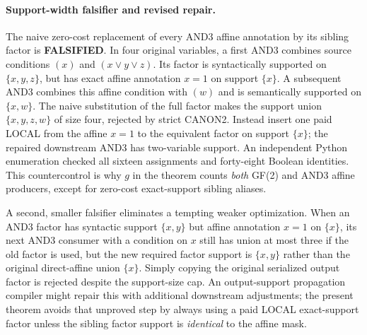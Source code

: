\documentclass[11pt]{article}
\begin{document}
\paragraph{Support-width falsifier and revised repair.}
The naive zero-cost replacement of every AND3 affine annotation by its sibling factor is \textbf{FALSIFIED}. In four original variables, a first AND3 combines source conditions $(x)$ and $(x\lor y\lor z)$. Its factor is syntactically supported on $\{x,y,z\}$, but has exact affine annotation $x=1$ on support $\{x\}$. A subsequent AND3 combines this affine condition with $(w)$ and is semantically supported on $\{x,w\}$. The naive substitution of the full factor makes the support union $\{x,y,z,w\}$ of size four, rejected by strict CANON2. Instead insert one paid LOCAL from the affine $x=1$ to the equivalent factor on support $\{x\}$; the repaired downstream AND3 has two-variable support. An independent Python enumeration checked all sixteen assignments and forty-eight Boolean identities. This countercontrol is why $g$ in the theorem counts \emph{both} GF(2) and AND3 affine producers, except for zero-cost exact-support sibling aliases.


A second, smaller falsifier eliminates a tempting weaker optimization. When an AND3 factor has syntactic support $\{x,y\}$ but affine annotation $x=1$ on $\{x\}$, its next AND3 consumer with a condition on $x$ still has union at most three if the old factor is used, but the new required factor support is $\{x,y\}$ rather than the original direct-affine union $\{x\}$. Simply copying the original serialized output factor is rejected despite the support-size cap. An output-support propagation compiler might repair this with additional downstream adjustments; the present theorem avoids that unproved step by always using a paid LOCAL exact-support factor unless the sibling factor support is \emph{identical} to the affine mask.
\end{document}
